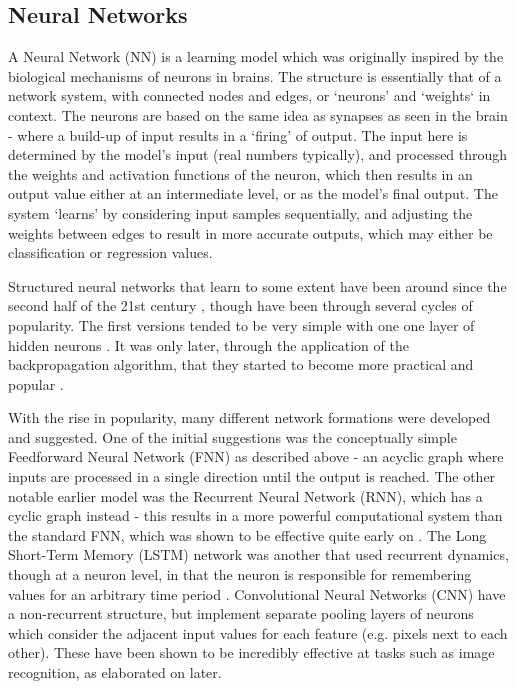 \documentclass[a4paper,11pt,oneside]{article}
\theoremstyle{plain}
\theoremstyle{definition}
\begin{document}
	\subsection{Neural Networks}\label{lr_nn}
	
	A Neural Network (NN) is a learning model which was originally inspired by the biological mechanisms of neurons 
	in brains. The structure is essentially that of a network system, with connected nodes and edges, or ‘neurons’ and 
	‘weights‘ in context. The neurons are based on the same idea as synapses as seen in the brain - where a build-up 
	of input results in a ‘firing’ of output. The input here is determined by the model’s input (real numbers typically), 
	and processed through the weights and activation functions of the neuron, which then results in an output value 
	either at an intermediate level, or as the model’s final output. The system ‘learns’ by considering input samples 
	sequentially, and adjusting the weights between edges to result in more accurate outputs, which may either be 
	classification or regression values. 
	\hfill \break 
	
	Structured neural networks that learn to some extent have been around since the second half of the 21st 
	century \citep{Schmidhuber}, though have been through several cycles of popularity. The first versions tended to be very simple 
	with one one layer of hidden neurons \citep{Ivakhnenko}. It was only later, through the application of 
	the backpropagation algorithm, that they started to become more practical and popular \citep{Werbos}.
	\hfill \break 
	
	With the rise in popularity, many different network formations were developed and suggested. One of the initial 
	suggestions was the conceptually simple Feedforward Neural Network (FNN) as described above - an acyclic
	graph where inputs are processed in a single direction until the output is reached. The other notable earlier model 
	was the Recurrent Neural Network (RNN), which has a cyclic graph instead - this results in a more powerful 
	computational system than the standard FNN, which was shown to be effective quite early on 
	\citep{Siegelmann}. The Long Short-Term Memory (LSTM) network was 
	another that used recurrent dynamics, though at a neuron level, in that the neuron is responsible for remembering 
	values for an arbitrary time period \citep{Hochreiter}. Convolutional Neural Networks (CNN) have a non-recurrent structure, 
	but implement separate pooling layers of neurons which consider the adjacent input values for each feature 
	(e.g. pixels next to each other). These have been shown to be incredibly effective at tasks such as image 
	recognition, as elaborated on later.
	\hfill \break 
	
\end{document}
